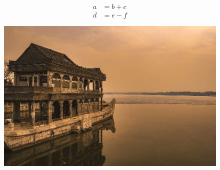 \documentclass{article}
\begin{document}
\begin{align}
    a & = b + c \\
    d & = e - f
\end{align}

\begin{figure}
    \includegraphics[width=\linewidth]{image.png}
    \label{fig:boat1}
\end{figure}
\end{document}
